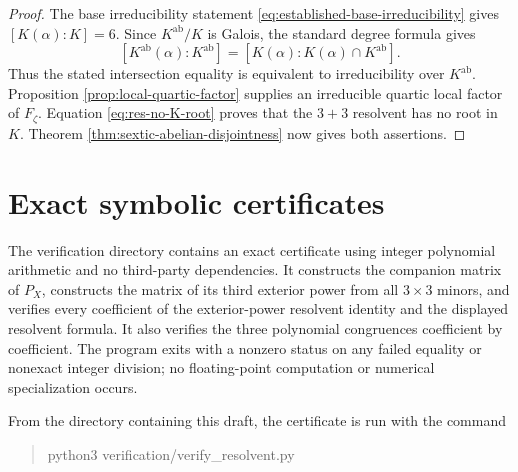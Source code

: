\documentclass[11pt]{article}
\begin{document}
\begin{proof}
The base irreducibility statement
\eqref{eq:established-base-irreducibility} gives
$[K(\alpha):K]=6$.  Since $K^{\mathrm{ab}}/K$ is Galois, the standard
degree formula gives
\[
 [K^{\mathrm{ab}}(\alpha):K^{\mathrm{ab}}]
 = [K(\alpha):K(\alpha)\cap K^{\mathrm{ab}}].
\]
Thus the stated intersection equality is equivalent to irreducibility
over $K^{\mathrm{ab}}$.  Proposition
\ref{prop:local-quartic-factor} supplies an irreducible quartic local
factor of $F_\zeta$.  Equation \eqref{eq:res-no-K-root} proves that the
$3+3$ resolvent has no root in $K$.  Theorem
\ref{thm:sextic-abelian-disjointness} now gives both assertions.
\end{proof}



\appendix

\section{Exact symbolic certificates}
\label{sec:exact-certificates}

The verification directory contains an exact certificate using integer
polynomial arithmetic and no third-party dependencies.  It constructs the
companion matrix of $P_X$, constructs the matrix of its third exterior power
from all $3\times3$ minors, and verifies every coefficient of the
exterior-power resolvent identity and the displayed resolvent formula.  It
also verifies the three polynomial congruences coefficient by coefficient.
The program exits with a nonzero status on any failed equality or nonexact
integer division; no floating-point computation or numerical specialization
occurs.

From the directory containing this draft, the certificate is run with the
command
\begin{quote}
\noindent python3 verification/verify\_resolvent.py
\end{quote}

\enlargethispage{2\baselineskip}
{\small


}
\end{document}
